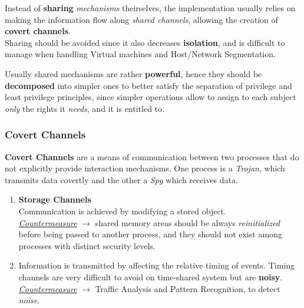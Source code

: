 Instead of \textbf{sharing} \textit{mechanisms} theirselves,
the implementation usually relies on making the information flow along \textit{shared channels}, 
allowing the creation of \textbf{covert channels}.\\
Sharing should be avoided since it also decreases \textbf{isolation},
and is difficult to manage when handling Virtual machines
and Host/Network Segmentation.

Usually shared mechanisms are rather \textbf{powerful}, hence they should be \textbf{decomposed} into
simpler ones to
better satisfy the separation of privilege and least
privilege principles,
since simpler operations allow to assign to each subject \textit{only} the rights it \textit{needs}, and it is entitled to.

\subsubsection{Covert Channels}

\textbf{Covert Channels} are a means of communication between two processes that do not explicitly provide interaction mechanisms.
One process is a \textit{Trojan}, which transmits data covertly
and the other a \textit{Spy} which receives data.

\begin{enumerate}
   \item \textbf{Storage Channels}\\
   Communication is achieved by modifying a stored object.\\
   \emph{\underline{Countermeasure}} $\longrightarrow$
   shared memory areas should be always \textit{reinitialized} before being passed to another
   process,
   and they should not exist among processes with distinct security levels.
   \item Information is transmitted by affecting the relative timing of events.
   Timing channels are very difficult to avoid on time-shared system but are \textbf{noisy}.
   \emph{\underline{Countermeasure}} $\longrightarrow$ Traffic Analysis and Pattern Recognition, to detect \textit{noise}.
\end{enumerate}

